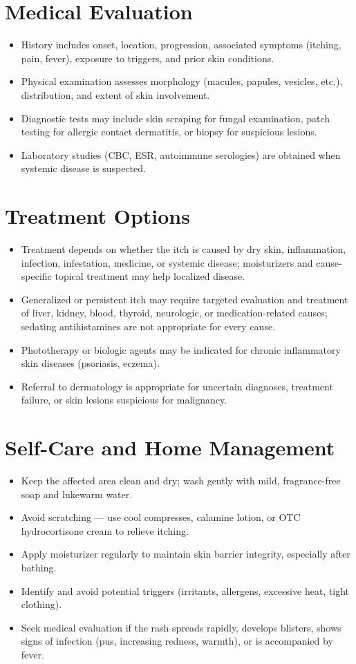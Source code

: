 \section*{Medical Evaluation}
\begin{itemize}
  \item History includes onset, location, progression, associated symptoms (itching, pain, fever), exposure to triggers, and prior skin conditions.
  \item Physical examination assesses morphology (macules, papules, vesicles, etc.), distribution, and extent of skin involvement.
  \item Diagnostic tests may include skin scraping for fungal examination, patch testing for allergic contact dermatitis, or biopsy for suspicious lesions.
  \item Laboratory studies (CBC, ESR, autoimmune serologies) are obtained when systemic disease is suspected.
\end{itemize}

\section*{Treatment Options}
\begin{itemize}
  \item Treatment depends on whether the itch is caused by dry skin, inflammation, infection, infestation, medicine, or systemic disease; moisturizers and cause-specific topical treatment may help localized disease.
  \item Generalized or persistent itch may require targeted evaluation and treatment of liver, kidney, blood, thyroid, neurologic, or medication-related causes; sedating antihistamines are not appropriate for every cause.
  \item Phototherapy or biologic agents may be indicated for chronic inflammatory skin diseases (psoriasis, eczema).
  \item Referral to dermatology is appropriate for uncertain diagnoses, treatment failure, or skin lesions suspicious for malignancy.
\end{itemize}

\section*{Self-Care and Home Management}
\begin{itemize}
  \item Keep the affected area clean and dry; wash gently with mild, fragrance-free soap and lukewarm water.
  \item Avoid scratching — use cool compresses, calamine lotion, or OTC hydrocortisone cream to relieve itching.
  \item Apply moisturizer regularly to maintain skin barrier integrity, especially after bathing.
  \item Identify and avoid potential triggers (irritants, allergens, excessive heat, tight clothing).
  \item Seek medical evaluation if the rash spreads rapidly, develops blisters, shows signs of infection (pus, increasing redness, warmth), or is accompanied by fever.
\end{itemize}

